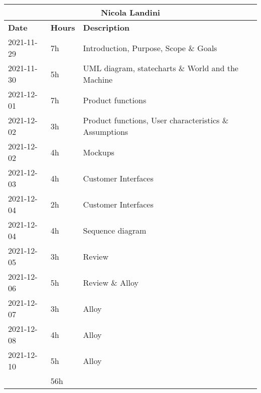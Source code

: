 \begin{table}[H]
    \centering
    \begin{tabular}{|l|l|l|}
        \multicolumn{3}{c}{\textbf{Nicola Landini}}                      \\
        \hline
        \textbf{Date} & \textbf{Hours} & \textbf{Description}                                   \\\hline
        2021-11-29    & 7h             & Introduction, Purpose, Scope \& Goals                  \\\hline
        2021-11-30    & 5h             & UML diagram, statecharts \& World and the Machine      \\\hline
        2021-12-01    & 7h             & Product functions                                      \\\hline
        2021-12-02    & 3h             & Product functions, User characteristics \& Assumptions \\\hline
        2021-12-02    & 4h             & Mockups                                                \\\hline
        2021-12-03    & 4h             & Customer Interfaces                                    \\\hline
        2021-12-04    & 2h             & Customer Interfaces                                    \\\hline
        2021-12-04    & 4h             & Sequence diagram                                       \\\hline
        2021-12-05    & 3h             & Review                                                 \\\hline
        2021-12-06    & 5h             & Review \& Alloy                                        \\\hline
        2021-12-07    & 3h             & Alloy                                                  \\\hline
        2021-12-08    & 4h             & Alloy                                                  \\\hline
        2021-12-10    & 5h             & Alloy                                                  \\\hline\hline
                      & 56h            &                                                        \\\hline
    \end{tabular}
\end{table}
\newpage
